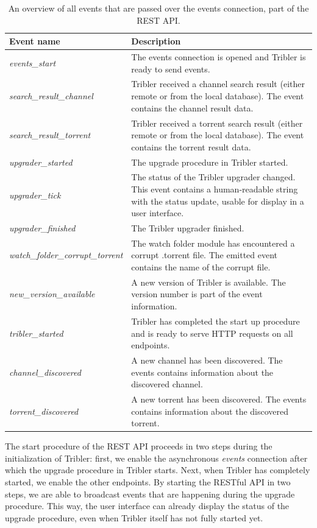 \begin{table}
	\begin{tabularx}{\textwidth}{|l|X|}
		\hline
		\textbf{Event name} & \textbf{Description} \\ \hline
		\emph{events\_start} & The events connection is opened and Tribler is ready to send events.  \\ \hline
		\emph{search\_result\_channel} & Tribler received a channel search result (either remote or from the local database). The event contains the channel result data. \\ \hline
		\emph{search\_result\_torrent} & Tribler received a torrent search result (either remote or from the local database). The event contains the torrent result data. \\ \hline
		\emph{upgrader\_started} & The upgrade procedure in Tribler started. \\ \hline
		\emph{upgrader\_tick} & The status of the Tribler upgrader changed. This event contains a human-readable string with the status update, usable for display in a user interface. \\ \hline
		\emph{upgrader\_finished} & The Tribler upgrader finished. \\ \hline
		\emph{watch\_folder\_corrupt\_torrent} & The watch folder module has encountered a corrupt .torrent file. The emitted event contains the name of the corrupt file.\\ \hline
		\emph{new\_version\_available} & A new version of Tribler is available. The version number is part of the event information.\\ \hline
		\emph{tribler\_started} & Tribler has completed the start up procedure and is ready to serve HTTP requests on all endpoints.\\ \hline
		\emph{channel\_discovered} & A new channel has been discovered. The events contains information about the discovered channel.\\ \hline
		\emph{torrent\_discovered} & A new torrent has been discovered. The events contains information about the discovered torrent.\\ \hline
	\end{tabularx}
	\caption{An overview of all events that are passed over the events connection, part of the REST API.}
	\label{table:rest-api-events}
\end{table}

\noindent The start procedure of the REST API proceeds in two steps during the initialization of Tribler: first, we enable the asynchronous \emph{events} connection after which the upgrade procedure in Tribler starts. Next, when Tribler has completely started, we enable the other endpoints. By starting the RESTful API in two steps, we are able to broadcast events that are happening during the upgrade procedure. This way, the user interface can already display the status of the upgrade procedure, even when Tribler itself has not fully started yet.


